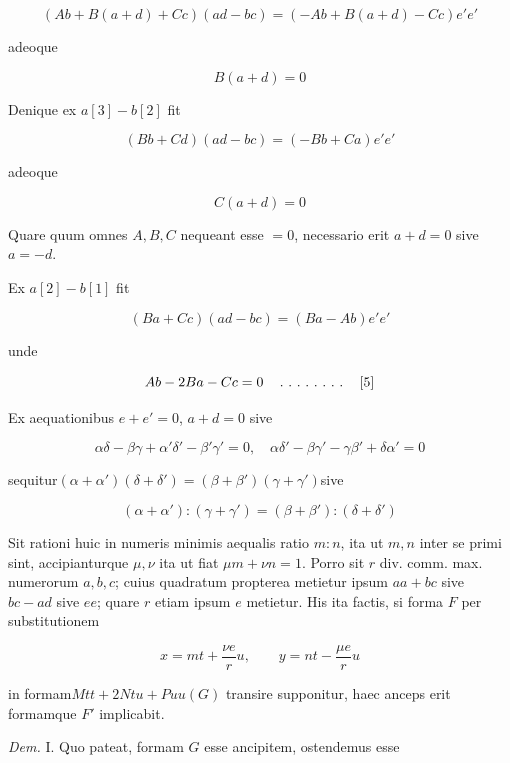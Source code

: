 
\[
(Ab+B(a+d)+Cc)(ad-bc)=(-Ab+B(a+d)-Cc)e'e'
\]

adeoque

\[
B(a+d)=0
\]

Denique ex $a[3]-b[2]$ fit

\[
(Bb+Cd)(ad-bc)=(-Bb+Ca)e'e'
\]

adeoque

\[
C(a+d)=0
\]

Quare quum omnes $A,B,C$ nequeant esse $=0$, necessario erit $a+d=0$ sive $a=-d$.

Ex $a[2]-b[1]$ fit

\[
(Ba+Cc)(ad-bc)=(Ba-Ab)e'e'
\]

unde

\[
Ab-2Ba-Cc=0\quad\mathinner{.\ .\ .\ .\ .\ .\ .\ .}\quad[5]
\]

Ex aequationibus $e+e'=0$, $a+d=0$ sive

\[
\alpha\delta-\beta\gamma+\alpha'\delta'-\beta'\gamma'=0,\quad\alpha\delta'-\beta\gamma'-\gamma\beta'+\delta\alpha'=0
\]

sequitur\quad $(\alpha+\alpha')(\delta+\delta')=(\beta+\beta')(\gamma+\gamma')$\quad sive

\[
(\alpha+\alpha'):(\gamma+\gamma')=(\beta+\beta'):(\delta+\delta')
\]

Sit rationi huic in numeris minimis aequalis ratio $m:n$, ita ut $m,n$ inter se primi sint, accipianturque $\mu,\nu$ ita ut fiat $\mu m+\nu n=1$. Porro sit $r$ div. comm. max. numerorum $a,b,c$; cuius quadratum propterea metietur ipsum $aa+bc$ sive $bc-ad$ sive $ee$; quare $r$ etiam ipsum $e$ metietur. His ita factis, si forma $F$ per substitutionem

\[
x=mt+\frac{\nu e}{r}u,\qquad y=nt-\frac{\mu e}{r}u
\]

in formam\quad $Mtt+2Ntu+Puu$\quad $(G)$ transire supponitur, haec anceps erit formamque $F'$ implicabit.


\emph{Dem.} I. Quo pateat, formam $G$ esse ancipitem, ostendemus esse

